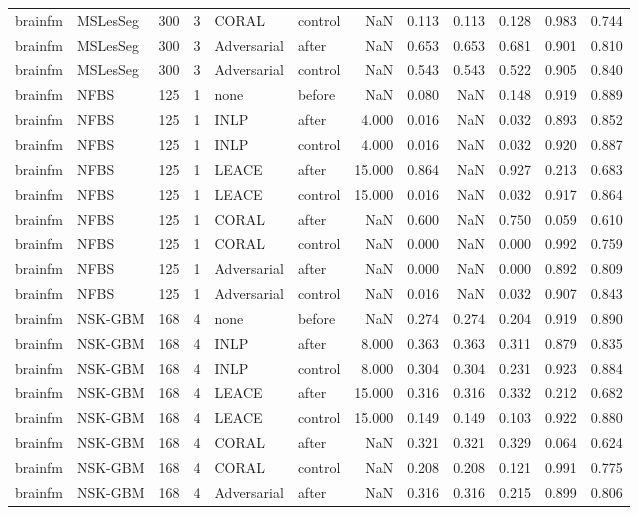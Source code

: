 \begin{tabular}{llrrllrrrrrr}
brainfm & MSLesSeg & 300 & 3 & CORAL & control & NaN & 0.113 & 0.113 & 0.128 & 0.983 & 0.744 \\
brainfm & MSLesSeg & 300 & 3 & Adversarial & after & NaN & 0.653 & 0.653 & 0.681 & 0.901 & 0.810 \\
brainfm & MSLesSeg & 300 & 3 & Adversarial & control & NaN & 0.543 & 0.543 & 0.522 & 0.905 & 0.840 \\
brainfm & NFBS & 125 & 1 & none & before & NaN & 0.080 & NaN & 0.148 & 0.919 & 0.889 \\
brainfm & NFBS & 125 & 1 & INLP & after & 4.000 & 0.016 & NaN & 0.032 & 0.893 & 0.852 \\
brainfm & NFBS & 125 & 1 & INLP & control & 4.000 & 0.016 & NaN & 0.032 & 0.920 & 0.887 \\
brainfm & NFBS & 125 & 1 & LEACE & after & 15.000 & 0.864 & NaN & 0.927 & 0.213 & 0.683 \\
brainfm & NFBS & 125 & 1 & LEACE & control & 15.000 & 0.016 & NaN & 0.032 & 0.917 & 0.864 \\
brainfm & NFBS & 125 & 1 & CORAL & after & NaN & 0.600 & NaN & 0.750 & 0.059 & 0.610 \\
brainfm & NFBS & 125 & 1 & CORAL & control & NaN & 0.000 & NaN & 0.000 & 0.992 & 0.759 \\
brainfm & NFBS & 125 & 1 & Adversarial & after & NaN & 0.000 & NaN & 0.000 & 0.892 & 0.809 \\
brainfm & NFBS & 125 & 1 & Adversarial & control & NaN & 0.016 & NaN & 0.032 & 0.907 & 0.843 \\
brainfm & NSK-GBM & 168 & 4 & none & before & NaN & 0.274 & 0.274 & 0.204 & 0.919 & 0.890 \\
brainfm & NSK-GBM & 168 & 4 & INLP & after & 8.000 & 0.363 & 0.363 & 0.311 & 0.879 & 0.835 \\
brainfm & NSK-GBM & 168 & 4 & INLP & control & 8.000 & 0.304 & 0.304 & 0.231 & 0.923 & 0.884 \\
brainfm & NSK-GBM & 168 & 4 & LEACE & after & 15.000 & 0.316 & 0.316 & 0.332 & 0.212 & 0.682 \\
brainfm & NSK-GBM & 168 & 4 & LEACE & control & 15.000 & 0.149 & 0.149 & 0.103 & 0.922 & 0.880 \\
brainfm & NSK-GBM & 168 & 4 & CORAL & after & NaN & 0.321 & 0.321 & 0.329 & 0.064 & 0.624 \\
brainfm & NSK-GBM & 168 & 4 & CORAL & control & NaN & 0.208 & 0.208 & 0.121 & 0.991 & 0.775 \\
brainfm & NSK-GBM & 168 & 4 & Adversarial & after & NaN & 0.316 & 0.316 & 0.215 & 0.899 & 0.806 \\

\end{tabular}
